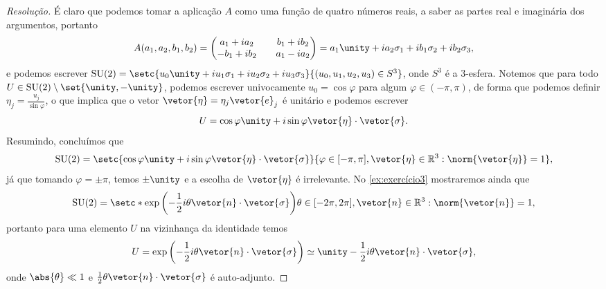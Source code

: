 \begin{proof}[Resolução]
    É claro que podemos tomar a aplicação \(A\) como uma função de quatro números reais, a saber as partes real e imaginária dos argumentos, portanto
    \begin{equation*}
        A(a_1, a_2, b_1,b_2) = \begin{pmatrix}
            a_1 + i a_2 && b_1 + i b_2\\
            -b_1 + i b_2 && a_1 - i a_2
        \end{pmatrix} = a_1 \unity + i a_2 \sigma_1 + i b_1 \sigma_2 + i b_2 \sigma_3,
    \end{equation*}
    e podemos escrever \(\mathrm{SU}(2) = \setc{u_0 \unity + i u_1 \sigma_1 + i u_2 \sigma_2 + i u_3 \sigma_3}{(u_0, u_1, u_2, u_3) \in S^3}\), onde \(S^3\) é a 3-esfera. Notemos que para todo \(U \in \mathrm{SU}(2) \setminus \set{\unity, -\unity}\), podemos escrever univocamente \(u_0 = \cos\varphi\) para algum \(\varphi \in (-\pi, \pi)\), de forma que podemos definir \(\eta_j = \frac{u_j}{\sin\varphi}\), o que implica que o vetor \(\vetor{\eta} = \eta_j \vetor{e}_j\) é unitário e podemos escrever
    \begin{equation*}
        U = \cos\varphi \unity + i \sin\varphi \vetor{\eta}\cdot \vetor{\sigma}.
    \end{equation*}
    Resumindo, concluímos que
    \begin{equation*}
        \mathrm{SU}(2) = \setc{\cos\varphi \unity + i \sin\varphi \vetor{\eta}\cdot \vetor{\sigma}}{\varphi \in [-\pi,\pi], \vetor{\eta} \in \mathbb{R}^3 : \norm{\vetor{\eta}} = 1},
    \end{equation*}
    já que tomando \(\varphi = \pm\pi\), temos \(\pm \unity\) e a escolha de \(\vetor{\eta}\) é irrelevante. No \cref{ex:exercício3} mostraremos ainda que
    \begin{equation*}
        \mathrm{SU}(2) = \setc*{\exp\left(-\frac12 i \theta \vetor{n}\cdot\vetor{\sigma}\right)}{\theta \in [-2\pi,2\pi], \vetor{n} \in \mathbb{R}^3 : \norm{\vetor{n}} = 1},
    \end{equation*}
    portanto para uma elemento \(U\) na vizinhança da identidade temos
    \begin{equation*}
        U = \exp\left(-\frac12 i \theta \vetor{n}\cdot\vetor{\sigma}\right) \simeq \unity - \frac12 i \theta \vetor{n} \cdot \vetor{\sigma},
    \end{equation*}
    onde \(\abs{\theta} \ll 1\) e \(\frac12 \theta \vetor{n} \cdot \vetor{\sigma}\) é auto-adjunto.


\end{proof}

